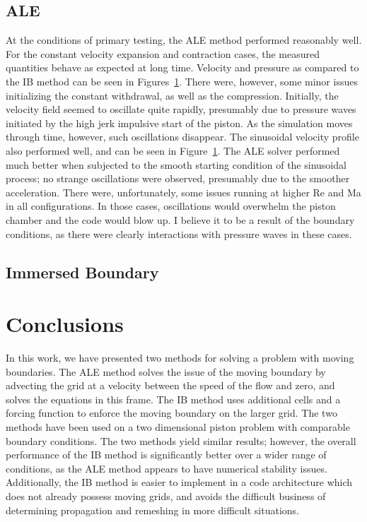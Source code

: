 \documentclass{article}
\begin{document}
%



\subsection{ALE}

At the conditions of primary testing, the ALE method performed reasonably well.  For the constant velocity expansion and contraction cases, the measured quantities behave as expected at long time.  Velocity and pressure as compared to the IB method can be seen in Figures~\ref{}.  There were, however, some minor issues initializing the constant withdrawal, as well as the compression.  Initially, the velocity field seemed to oscillate quite rapidly, presumably due to pressure waves initiated by the high jerk impulsive start of the piston.  As the simulation moves through time, however, such oscillations disappear.  The sinusoidal velocity profile also performed well, and can be seen in Figure~\ref{}.  The ALE solver performed much better when subjected to the smooth starting condition of the sinusoidal process; no strange oscillations were observed, presumably due to the smoother acceleration.  There were, unfortunately, some issues running at higher Re and Ma in all configurations. In those cases, oscillations would overwhelm the piston chamber and the code would blow up.  I believe it to be a result of the boundary conditions, as there were clearly interactions with pressure waves in these cases.  

\subsection{Immersed Boundary}





\section{Conclusions}

In this work, we have presented two methods for solving a problem with moving boundaries.  The ALE method solves the issue of the moving boundary by advecting the grid at a velocity between the speed of the flow and zero, and solves the equations in this frame.  The IB method uses additional cells and a forcing function to enforce the moving boundary on the larger grid.  The two methods have been used on a two dimensional piston problem with comparable boundary conditions.  The two methods yield similar results; however, the overall performance of the IB method is significantly better over a wider range of conditions, as the ALE method appears to have numerical stability issues.  Additionally, the IB method is easier to implement in a code architecture which does not already possess moving grids, and avoids the difficult business of determining propagation and remeshing in more difficult situations.
\end{document}
